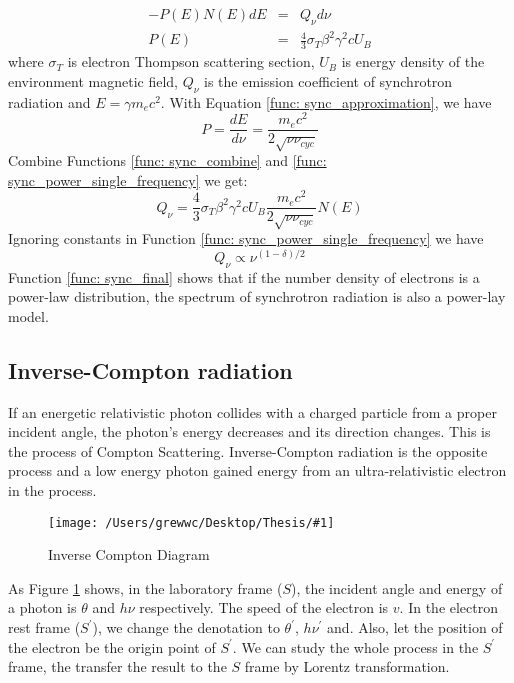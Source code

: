 \documentclass[12pt]{report}
\newcommand{\singleFig}[3]{
  \begin{figure}[!htp]
    \centering
    \texttt{[image: /Users/grewwc/Desktop/Thesis/\#1]}
    \caption{#3}
    \label{fig: #1}
  \end{figure}
}
\begin{document}
            \begin{eqnarray}
              \label{func: sync_power_single_frequency}
              -P\left(E\right)N\left(E\right)dE &=& Q_{\nu} d\nu\\
              P\left(E\right) &=& \frac{4}{3} \sigma_{T} \beta^2 \gamma^2 c U_B
            \end{eqnarray} 
            where $\sigma_{T}$ is electron Thompson scattering section, $U_B$ is energy 
            density of the environment magnetic field, $Q_{\nu}$ is the emission coefficient 
            of synchrotron radiation and $E=\gamma m_e c^2$. With Equation 
            \ref{func: sync_approximation}, we have
            \begin{equation}
              \label{func: sync_combine}
              P = \frac{dE}{d\nu} = \frac{m_e c^2}{2\sqrt{\nu \nu_{cyc}}}
            \end{equation}
            Combine Functions \ref{func: sync_combine} and 
            \ref{func: sync_power_single_frequency} we get:
            \begin{equation}
              Q_{\nu} = \frac{4}{3} \sigma_{T} \beta^2 \gamma^2 c U_B \frac{m_e c^2}{2\sqrt{\nu \nu_{cyc}}} N\left(E\right)
            \end{equation}
            Ignoring constants in Function \ref{func: sync_power_single_frequency} we have 
            \begin{equation}
              \label{func: sync_final}
              Q_{\nu} \propto \nu^{(1-\delta)/2}
            \end{equation}
            Function \ref{func: sync_final} shows that if the number density of electrons is 
            a power-law distribution, the spectrum of synchrotron radiation is also a 
            power-lay model.  
            
          \subsection{Inverse-Compton radiation}
            If an energetic relativistic photon collides with a charged particle from a 
            proper incident angle, the photon's energy decreases and its direction changes. 
            This is the process of Compton Scattering. Inverse-Compton radiation is the 
            opposite process and a low energy photon gained energy from an ultra-relativistic 
            electron in the process. 

            \singleFig{inverse_compton}{0.45}{Inverse Compton Diagram}
            As Figure \ref{fig: inverse_compton} shows, in the laboratory frame ($S$), the 
            incident angle and energy of a photon is $\theta$ and $h \nu$ respectively. 
            The speed of the electron is $v$. In the electron rest frame ($S^{\prime}$), 
            we change the denotation to $\theta^{\prime}$, $h \nu^{\prime}$ and. Also, let 
            the position of the electron be the origin point of $S^{\prime}$. We can study 
            the whole process in the $S^{\prime}$ frame, the transfer the result to the $S$ 
            frame by Lorentz transformation. 
\end{document}

